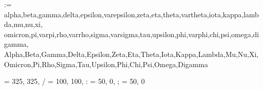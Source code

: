 \newcommand{\savesffamily}{\sfdefault}
\makeatletter
\newcommand{\savesfmdseries}{\mdseries@sf}
\newcommand{\savesfbfseries}{\bfseries@sf}
\makeatother

\usepackage[charter, greeklowercase=italicized, greekuppercase=italicized, sfscaled=false, ttscaled=false, euro=false]{mathdesign}
\let \savermfamily   \rmdefault
\let \savermmdseries \mddefault
\let \savermbfseries \bfdefault

\makeatletter
\@for\@tempa:=%
	alpha,beta,gamma,delta,epsilon,varepsilon,zeta,eta,theta,vartheta,iota,kappa,lambda,mu,nu,xi,%
	omicron,pi,varpi,rho,varrho,sigma,varsigma,tau,upsilon,phi,varphi,chi,psi,omega,digamma,%
	Alpha,Beta,Gamma,Delta,Epsilon,Zeta,Eta,Theta,Iota,Kappa,Lambda,Mu,Nu,Xi,%
	Omicron,Pi,Rho,Sigma,Tau,Upsilon,Phi,Chi,Psi,Omega,Digamma%
	\do{%
		\expandafter\let\csname up\@tempa\expandafter\endcsname\csname\@tempa up\endcsname%
	}%
\makeatother

\ifx\nequiv\undefined
	\newcommand{\nequiv}{\not\equiv}
\fi

\usepackage[scaled=.96, lining, sups]{XCharter}  %
\let \savermdefaultfortext \rmdefault
\let \savemddefaultfortext \mddefault
\let \savebfdefaultfortext \bfdefault
\renewcommand{\textellipsis}{\mbox{.{\kern.09em}.{\kern.09em}.}}
\makeatletter
\newcommand{\@makefnmarkorig}{%
	\hbox{\sufigures\hspace*{.04em}\@thefnmark\hspace*{.04em}}%
}  %
\makeatother

\ifxetex
\else
		{\textemdash = {325, 325},
		           / = {100, 100},
		           : = { 50,   0},
		           ; = { 50,   0}}
\fi


